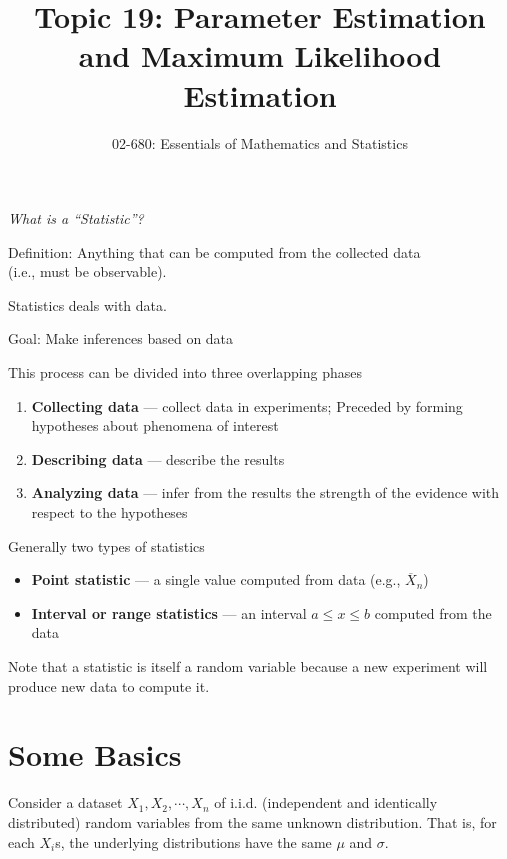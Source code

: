 

\title{Topic 19: Parameter Estimation and Maximum Likelihood Estimation}
\author{02-680: Essentials of Mathematics and Statistics}


\maketitle


\emph{What is a ``Statistic''?}
\begin{center}
Definition: Anything that can be computed from the collected data\\ (i.e., must be observable).
\end{center}

Statistics deals with data.

Goal: Make inferences based on data

This process can be divided into three overlapping phases
\begin{enumerate}
\item \textbf{Collecting data} --- collect data in experiments; Preceded by forming hypotheses about phenomena of interest 
\item \textbf{Describing data} --- describe the results
\item \textbf{Analyzing data} --- infer from the results the strength of the evidence with respect to the hypotheses
\end{enumerate}

Generally two types of statistics
\begin{itemize}
\item[] \textbf{Point statistic} --- a single value computed from data (e.g., $\overline{X}_n$)
\item[] \textbf{Interval or range statistics} ---  an interval $a\le x \le b$ computed from the data
\end{itemize} 

Note that a statistic is itself a random variable 
because a new experiment will produce new data to compute it.

\section{Some Basics}

Consider a dataset $X_1, X_2, \cdots, X_n$ of i.i.d. (independent and identically distributed) random variables from the same unknown distribution. 
That is, for each $X_i$s, the underlying distributions have the same $\mu$ and $\sigma$. 

